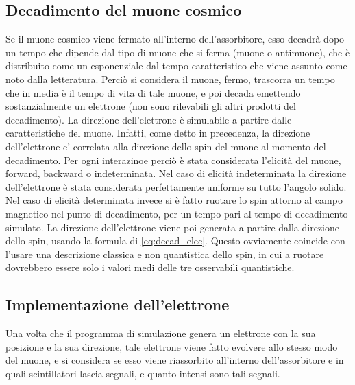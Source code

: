 \subsection{Decadimento del muone cosmico}
Se il muone cosmico viene fermato all'interno dell'assorbitore, esso decadrà dopo un tempo che dipende dal tipo di muone che si ferma (muone o antimuone), che è distribuito
come un esponenziale dal tempo caratteristico che viene assunto come noto dalla letteratura. Perciò si considera il muone, fermo, trascorra un tempo che in media è il tempo
di vita di tale muone, e poi decada emettendo sostanzialmente un elettrone (non sono rilevabili gli altri prodotti del decadimento). La direzione dell'elettrone \`e simulabile a partire dalle caratteristiche del muone. Infatti, come detto in precedenza, la direzione dell'elettrone e' correlata alla direzione dello spin del muone al momento del decadimento. Per ogni interazinoe perci\`o \`e stata considerata l'elicit\`a del muone, forward, backward o indeterminata. Nel caso di elicit\`a indeterminata la direzione dell'elettrone \`e stata considerata perfettamente uniforme su tutto l'angolo solido. Nel caso di elicit\`a determinata invece si \`e fatto ruotare lo spin attorno al campo magnetico nel punto di decadimento, per un tempo pari al tempo di decadimento simulato. La direzione dell'elettrone viene poi generata a partire dalla direzione dello spin, usando la formula di \ref{eq:decad_elec}. Questo ovviamente coincide con l'usare una descrizione classica e non quantistica dello spin, in cui a ruotare dovrebbero essere solo i valori medi delle tre osservabili quantistiche.

\subsection{Implementazione dell'elettrone}
Una volta che il programma di simulazione genera un elettrone con la sua posizione e la sua direzione, tale elettrone viene fatto evolvere allo stesso modo del muone, e si considera se esso viene riassorbito all'interno dell'assorbitore e in quali scintillatori lascia segnali, e quanto intensi sono tali segnali.

